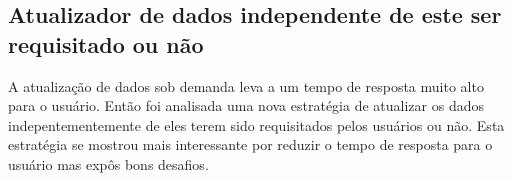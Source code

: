 \subsection{Atualizador de dados independente de este ser requisitado ou não}

A atualização de dados sob demanda leva a um tempo de resposta muito alto para o usuário. Então foi analisada uma nova estratégia de atualizar os dados indepentementemente de eles terem sido requisitados pelos usuários ou não. Esta estratégia se mostrou mais interessante por reduzir o tempo de resposta para o usuário mas expôs bons desafios.

